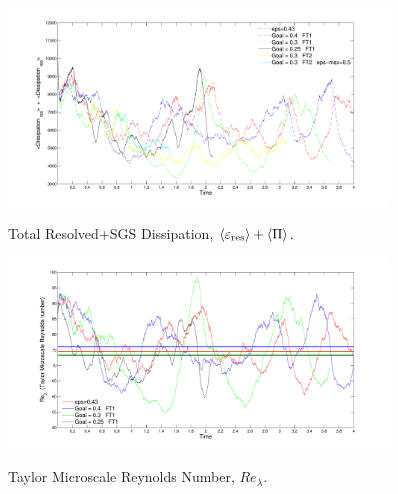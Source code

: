 \begin{figure}
  \vspace{-20pt}
\begin{center}
  \includegraphics[width=0.9\textwidth]{figures/Statistics/TotalResolved+SGSDissipation.pdf}\\
\end{center}
  \vspace{-20pt}
  \caption{Total Resolved+SGS Dissipation, $\langle \varepsilon_{\rm res} \rangle + \langle \Pi \rangle$.}
  \label{fig:TotalD}
\end{figure}



\begin{figure}
  \vspace{-20pt}
\begin{center}
  \includegraphics[width=0.9\textwidth]{figures/Statistics/ReTaylor.pdf}\\
\end{center}
  \vspace{-20pt}
  \caption{Taylor Microscale Reynolds Number, $Re_{\lambda}$.}
  \label{fig:ReTaylor}
\end{figure}












